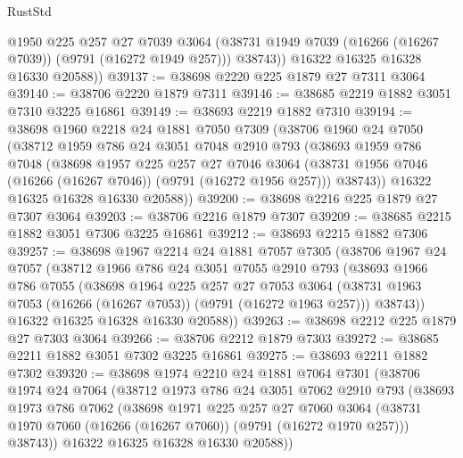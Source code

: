 \begin{lexlean}{RustStd}
\begin{coremodule}
            @1950
            @225
            @257
            @27
            @7039
            @3064
            (@38731 @1949 @7039 (@16266 (@16267 @7039)) (@9791 (@16272 @1949 @257)))
            @38743))
        @16322
        @16325
        @16328
        @16330
        @20588))
@39137 := @38698 @2220 @225 @1879 @27 @7311 @3064
@39140 := @38706 @2220 @1879 @7311
@39146 := @38685 @2219 @1882 @3051 @7310 @3225 @16861
@39149 := @38693 @2219 @1882 @7310
@39194 := @38698
    @1960
    @2218
    @24
    @1881
    @7050
    @7309
    (@38706
      @1960
      @24
      @7050
      (@38712
        @1959
        @786
        @24
        @3051
        @7048
        @2910
        @793
        (@38693
          @1959
          @786
          @7048
          (@38698
            @1957
            @225
            @257
            @27
            @7046
            @3064
            (@38731 @1956 @7046 (@16266 (@16267 @7046)) (@9791 (@16272 @1956 @257)))
            @38743))
        @16322
        @16325
        @16328
        @16330
        @20588))
@39200 := @38698 @2216 @225 @1879 @27 @7307 @3064
@39203 := @38706 @2216 @1879 @7307
@39209 := @38685 @2215 @1882 @3051 @7306 @3225 @16861
@39212 := @38693 @2215 @1882 @7306
@39257 := @38698
    @1967
    @2214
    @24
    @1881
    @7057
    @7305
    (@38706
      @1967
      @24
      @7057
      (@38712
        @1966
        @786
        @24
        @3051
        @7055
        @2910
        @793
        (@38693
          @1966
          @786
          @7055
          (@38698
            @1964
            @225
            @257
            @27
            @7053
            @3064
            (@38731 @1963 @7053 (@16266 (@16267 @7053)) (@9791 (@16272 @1963 @257)))
            @38743))
        @16322
        @16325
        @16328
        @16330
        @20588))
@39263 := @38698 @2212 @225 @1879 @27 @7303 @3064
@39266 := @38706 @2212 @1879 @7303
@39272 := @38685 @2211 @1882 @3051 @7302 @3225 @16861
@39275 := @38693 @2211 @1882 @7302
@39320 := @38698
    @1974
    @2210
    @24
    @1881
    @7064
    @7301
    (@38706
      @1974
      @24
      @7064
      (@38712
        @1973
        @786
        @24
        @3051
        @7062
        @2910
        @793
        (@38693
          @1973
          @786
          @7062
          (@38698
            @1971
            @225
            @257
            @27
            @7060
            @3064
            (@38731 @1970 @7060 (@16266 (@16267 @7060)) (@9791 (@16272 @1970 @257)))
            @38743))
        @16322
        @16325
        @16328
        @16330
        @20588))

\end{coremodule}
\end{lexlean}
